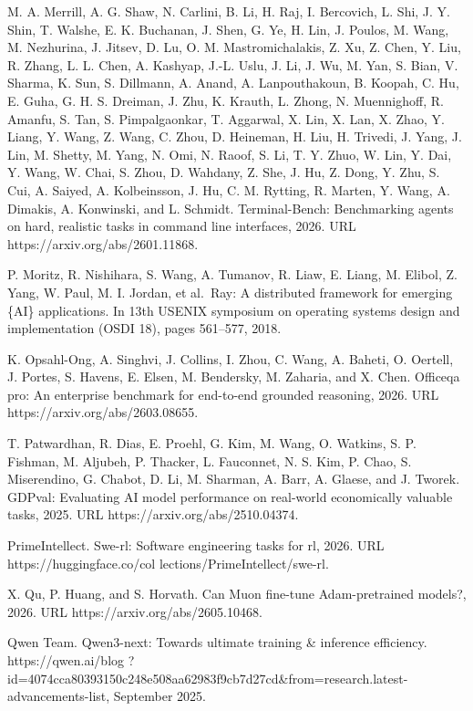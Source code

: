 \documentclass[
  10
]{article}
\begin{document}
M. A. Merrill, A. G. Shaw, N. Carlini, B. Li, H. Raj, I. Bercovich, L.
Shi, J. Y. Shin, T. Walshe, E. K. Buchanan, J. Shen, G. Ye, H. Lin, J.
Poulos, M. Wang, M. Nezhurina, J. Jitsev, D. Lu, O. M. Mastromichalakis,
Z. Xu, Z. Chen, Y. Liu, R. Zhang, L. L. Chen, A. Kashyap, J.-L. Uslu, J.
Li, J. Wu, M. Yan, S. Bian, V. Sharma, K. Sun, S. Dillmann, A. Anand, A.
Lanpouthakoun, B. Koopah, C. Hu, E. Guha, G. H. S. Dreiman, J. Zhu, K.
Krauth, L. Zhong, N. Muennighoff, R. Amanfu, S. Tan, S. Pimpalgaonkar, T.
Aggarwal, X. Lin, X. Lan, X. Zhao, Y. Liang, Y. Wang, Z. Wang, C. Zhou,
D. Heineman, H. Liu, H. Trivedi, J. Yang, J. Lin, M. Shetty, M. Yang, N.
Omi, N. Raoof, S. Li, T. Y. Zhuo, W. Lin, Y. Dai, Y. Wang, W. Chai, S.
Zhou, D. Wahdany, Z. She, J. Hu, Z. Dong, Y. Zhu, S. Cui, A. Saiyed, A.
Kolbeinsson, J. Hu, C. M. Rytting, R. Marten, Y. Wang, A. Dimakis, A.
Konwinski, and L. Schmidt. Terminal-Bench: Benchmarking agents on hard,
realistic tasks in command line interfaces, 2026. URL
https://arxiv.org/abs/2601.11868.

P. Moritz, R. Nishihara, S. Wang, A. Tumanov, R. Liaw, E. Liang, M.
Elibol, Z. Yang, W. Paul, M. I. Jordan, et al.~Ray: A distributed
framework for emerging \{AI\} applications. In 13th USENIX symposium on
operating systems design and implementation (OSDI 18), pages 561--577,
2018.



K. Opsahl-Ong, A. Singhvi, J. Collins, I. Zhou, C. Wang, A. Baheti, O.
Oertell, J. Portes, S. Havens, E. Elsen, M. Bendersky, M. Zaharia, and
X. Chen. Officeqa pro: An enterprise benchmark for end-to-end grounded
reasoning, 2026. URL https://arxiv.org/abs/2603.08655.

T. Patwardhan, R. Dias, E. Proehl, G. Kim, M. Wang, O. Watkins, S. P.
Fishman, M. Aljubeh, P. Thacker, L. Fauconnet, N. S. Kim, P. Chao, S.
Miserendino, G. Chabot, D. Li, M. Sharman, A. Barr, A. Glaese, and J.
Tworek. GDPval: Evaluating AI model performance on real-world
economically valuable tasks, 2025. URL https://arxiv.org/abs/2510.04374.

PrimeIntellect. Swe-rl: Software engineering tasks for rl, 2026. URL
https://huggingface.co/col lections/PrimeIntellect/swe-rl.

X. Qu, P. Huang, and S. Horvath. Can Muon fine-tune Adam-pretrained
models?, 2026. URL https://arxiv.org/abs/2605.10468.

Qwen Team. Qwen3-next: Towards ultimate training \& inference efficiency.
https://qwen.ai/blog
?id=4074cca80393150c248e508aa62983f9cb7d27cd\&from=research.latest-advancements-list,
September 2025.
\end{document}
